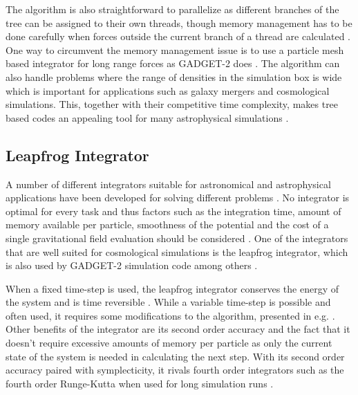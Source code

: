 \documentclass[english, oneside]{HYgradu}
\begin{document}
The algorithm is also straightforward to parallelize as different branches of the tree can be assigned to their own threads, though memory management has to be done carefully when forces outside the current branch of a thread are calculated \citep{binney2008galactic}. One way to circumvent the memory management issue is to use a particle mesh based integrator for long range forces as GADGET-2 does \citep{springel2005cosmological}. The algorithm can also handle problems where the range of densities in the simulation box is wide which is important for applications such as galaxy mergers and cosmological simulations. This, together with their competitive time complexity, makes tree based codes an appealing tool for many astrophysical simulations \citep{binney2008galactic}.


\subsection{Leapfrog Integrator} \label{sect:leapfrog}
A number of different integrators suitable for astronomical and astrophysical applications have been developed  for solving different problems \citep{binney2008galactic}. No integrator is optimal for every task and thus factors such as the integration time, amount of memory available per particle, smoothness of the potential and the cost of a single gravitational field evaluation should be considered \citep{binney2008galactic}. One of the integrators that are well suited for cosmological simulations is the leapfrog integrator, which is also used by GADGET-2 simulation code among others \citep{springel2005cosmological}.

When a fixed time-step is used, the leapfrog integrator conserves the energy of the system and is time reversible \citep{binney2008galactic}. While a variable time-step is possible and often used, it requires some modifications to the algorithm, presented in e.g. \citet{springel2005cosmological}. Other benefits of the integrator are its second order accuracy and the fact that it doesn't require excessive amounts of memory per particle as only the current state of the system is needed in calculating the next step\citep{binney2008galactic}. With its second order accuracy paired with symplecticity, it rivals fourth order integrators such as the fourth order Runge-Kutta when used for long simulation runs \citep{binney2008galactic}.


%    
\end{document}
